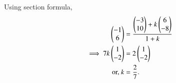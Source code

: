 Using section formula,
\begin{align}
         \begin{pmatrix}-1\\6\end{pmatrix} &=\frac{{\begin{pmatrix}-3\\10\end{pmatrix}+k\begin{pmatrix}6\\-8\end{pmatrix}}}{1+k}\\
	 \implies 7k\begin{pmatrix}1 \\ -2\end{pmatrix} &= 2\begin{pmatrix}1 \\ -2\end{pmatrix}
	 \\
	 \text{or, } k &= \frac{2}{7}.
\end{align}

